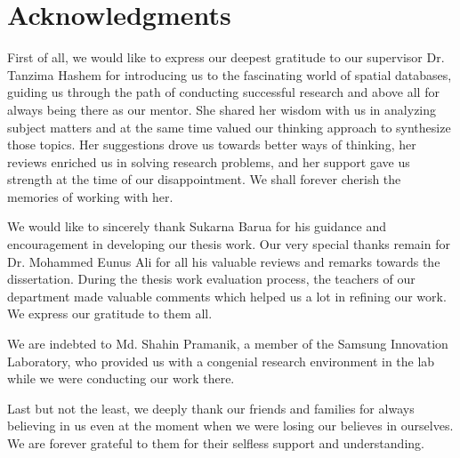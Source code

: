 \chapter*{Acknowledgments}

\hspace{3ex}
First of all, we would like to express our deepest gratitude to our supervisor Dr. \hspace{-0.8ex}Tanzima Hashem for introducing us to the fascinating world of spatial databases, guiding us through the path of conducting successful research and above all for always being there as our mentor. She shared her wisdom with us in analyzing subject matters and at the same time valued our thinking approach to synthesize those topics. Her suggestions drove us towards better ways of thinking, her reviews enriched us in solving research problems, and her support gave us strength at the time of our disappointment. We shall forever cherish the memories of working with her. 

We would like to sincerely thank Sukarna Barua for his guidance and encouragement in developing our thesis work. Our very special thanks remain for Dr. \hspace{-0.14ex}Mohammed Eunus Ali for all his valuable reviews and remarks towards the dissertation. During the thesis work evaluation process, the teachers of our department made valuable comments which helped us a lot in refining our work. We express our gratitude to them all.

We are indebted to Md. Shahin Pramanik, a member of the Samsung Innovation Laboratory, who provided us with a congenial research environment in the lab while we were conducting our work there.

Last but not the least, we deeply thank our friends and families for always believing in us even at the moment when we were losing our believes in ourselves. We are forever grateful to them for their selfless support and understanding.





